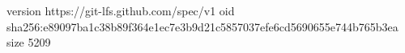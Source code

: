 version https://git-lfs.github.com/spec/v1
oid sha256:e89097ba1c38b89f364e1ec7e3b9d21c5857037efe6cd5690655e744b765b3ea
size 5209
